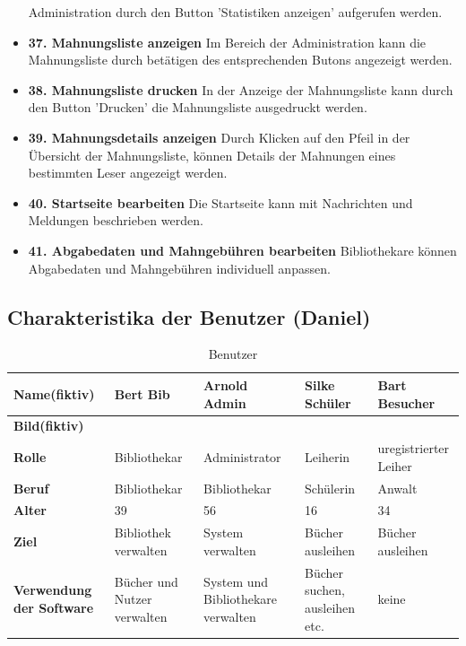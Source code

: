 \documentclass[fontsize=12pt,paper=a4,twoside]{scrartcl}
\begin{document}
\begin{itemize}
  Administration durch den Button
  'Statistiken anzeigen' aufgerufen werden.
  \item \textbf{37. Mahnungsliste anzeigen}
  Im Bereich der Administration kann die
  Mahnungsliste durch betätigen des 
  entsprechenden Butons angezeigt werden.
  \item \textbf{38. Mahnungsliste drucken}
  In der Anzeige der Mahnungsliste kann durch 
  den Button 'Drucken' die Mahnungsliste
  ausgedruckt werden.
  \item \textbf{39. Mahnungsdetails anzeigen}
  Durch Klicken auf den Pfeil in der 
  Übersicht der Mahnungsliste, können Details
  der Mahnungen eines bestimmten Leser 
  angezeigt werden.
  \item \textbf{40. Startseite bearbeiten}
  Die Startseite kann mit Nachrichten und
  Meldungen beschrieben werden.
  \item \textbf{41. Abgabedaten und Mahngebühren bearbeiten}
  Bibliothekare können Abgabedaten und
  Mahngebühren individuell anpassen.
 \end{itemize}


\subsection{Charakteristika der Benutzer (Daniel)}


\begin{table}[htbp]
\caption{Benutzer}
\label{benutzer}
\begin{tabular}{|p{}||p{}|p{}|p{}|p{}|}
\hline 
\textbf{Name(fiktiv)} & Bert Bib & Arnold Admin & Silke Schüler & Bart Besucher\\ \hline
\textbf{Bild(fiktiv)} & & & & \\ \hline
\textbf{Rolle} & Bibliothekar & Administrator & Leiherin & uregistrierter Leiher \\ \hline
\textbf{Beruf} & Bibliothekar & Bibliothekar & Schülerin & Anwalt\\ \hline
\textbf{Alter} & 39 & 56 & 16 & 34\\ \hline
\textbf{Ziel} & Bibliothek verwalten & System verwalten & Bücher ausleihen & Bücher ausleihen \\ \hline
\textbf{Verwendung der Software} & Bücher und Nutzer verwalten & System und Bibliothekare verwalten 
& Bücher suchen, ausleihen etc. & keine\\ \hline
\end{tabular}
\end{table}
\end{document}

